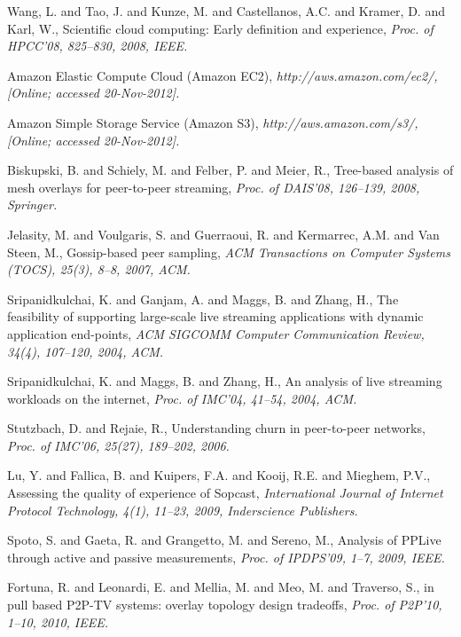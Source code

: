 {\begin{thebibliography}{5}
Wang, L. and Tao, J. and Kunze, M. and Castellanos, A.C. and Kramer, D. and Karl, W.,
\newblock Scientific cloud computing: Early definition and experience,
\newblock \emph{Proc. of HPCC'08, 825--830, 2008, IEEE.}

\newblock Amazon Elastic Compute Cloud ({Amazon EC2}),
\newblock \emph{{http://aws.amazon.com/ec2/}, [Online; accessed 20-Nov-2012].}

\newblock Amazon Simple Storage Service ({Amazon S3}),
\newblock \emph{{http://aws.amazon.com/s3/}, [Online; accessed 20-Nov-2012].}

Biskupski, B. and Schiely, M. and Felber, P. and Meier, R.,
\newblock Tree-based analysis of mesh overlays for peer-to-peer streaming,
\newblock \emph{Proc. of DAIS'08, 126--139, 2008, Springer.}

Jelasity, M. and Voulgaris, S. and Guerraoui, R. and Kermarrec, A.M. and Van Steen, M.,
\newblock Gossip-based peer sampling,
\newblock \emph{ACM Transactions on Computer Systems (TOCS), 25(3), 8--8, 2007, ACM.}

Sripanidkulchai, K. and Ganjam, A. and Maggs, B. and Zhang, H.,
\newblock The feasibility of supporting large-scale live streaming applications with dynamic application end-points,
\newblock \emph{ACM SIGCOMM Computer Communication Review, 34(4), 107--120, 2004, ACM.}

Sripanidkulchai, K. and Maggs, B. and Zhang, H.,
\newblock An analysis of live streaming workloads on the internet,
\newblock \emph{Proc. of IMC'04, 41--54, 2004, ACM.}

Stutzbach, D. and Rejaie, R.,
\newblock Understanding churn in peer-to-peer networks,
\newblock \emph{Proc. of IMC'06, 25(27), 189--202, 2006.}

Lu, Y. and Fallica, B. and Kuipers, F.A. and Kooij, R.E. and Mieghem, P.V.,
\newblock Assessing the quality of experience of {Sopcast},
\newblock \emph{International Journal of Internet Protocol Technology, 4(1), 11--23, 2009, Inderscience Publishers.}

Spoto, S. and Gaeta, R. and Grangetto, M. and Sereno, M.,
\newblock Analysis of {PPLive} through active and passive measurements,
\newblock \emph{Proc. of IPDPS'09, 1--7, 2009, IEEE.}

Fortuna, R. and Leonardi, E. and Mellia, M. and Meo, M. and Traverso, S.,
 in pull based {P2P-TV} systems: overlay topology design tradeoffs,
\newblock \emph{Proc. of P2P'10, 1--10, 2010, IEEE.}


\end{thebibliography}}
